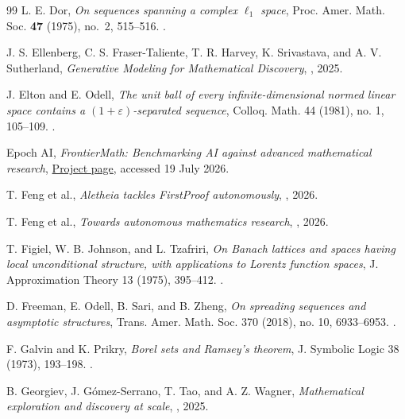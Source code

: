 \documentclass[11pt,reqno]{amsart}
\theoremstyle{plain}
\theoremstyle{definition}
\begin{document}
\begin{thebibliography}{99}
L. E. Dor,
\newblock \emph{On sequences spanning a complex $\ell_1$ space},
\newblock Proc. Amer. Math. Soc. \textbf{47} (1975), no.~2, 515--516.
\newblock {}.

J. S. Ellenberg, C. S. Fraser-Taliente, T. R. Harvey,
K. Srivastava, and A. V. Sutherland,
\newblock \emph{Generative Modeling for Mathematical Discovery},
\newblock {}, 2025.

J. Elton and E. Odell,
\newblock \emph{The unit ball of every infinite-dimensional normed linear space contains a $(1+\varepsilon)$-separated sequence},
\newblock Colloq. Math. 44 (1981), no. 1, 105--109.
\newblock {}.

Epoch AI,
\newblock \emph{FrontierMath: Benchmarking AI against advanced mathematical research},
\newblock \href{https://epoch.ai/frontiermath}{Project page}, accessed 19 July 2026.

T. Feng et al.,
\newblock \emph{Aletheia tackles FirstProof autonomously},
\newblock {}, 2026.

T. Feng et al.,
\newblock \emph{Towards autonomous mathematics research},
\newblock {}, 2026.

T. Figiel, W. B. Johnson, and L. Tzafriri,
\newblock \emph{On Banach lattices and spaces having local unconditional
structure, with applications to Lorentz function spaces},
\newblock J. Approximation Theory 13 (1975), 395--412.
\newblock {}.

D. Freeman, E. Odell, B. Sari, and B. Zheng,
\newblock \emph{On spreading sequences and asymptotic structures},
\newblock Trans. Amer. Math. Soc. 370 (2018), no. 10, 6933--6953.
\newblock {}.

F. Galvin and K. Prikry,
\newblock \emph{Borel sets and Ramsey's theorem},
\newblock J. Symbolic Logic 38 (1973), 193--198.
\newblock {}.

B. Georgiev, J. G\'omez-Serrano, T. Tao, and A. Z. Wagner,
\newblock \emph{Mathematical exploration and discovery at scale},
\newblock {}, 2025.


\end{thebibliography}
\end{document}
